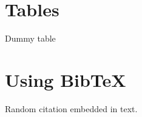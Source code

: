 \documentclass{article}
\begin{document}
    \section{Tables}

    \begin{table}[h!]
	\caption{Dummy table}
    \end{table}

    \newpage

    \section{Using BibTeX}

    Random citation \cite{DUMMY:1} embedded in text.
    
    \begin{appendix}
	\listoffigures
	\listoftables
    \end{appendix}

    
    
\end{document}
